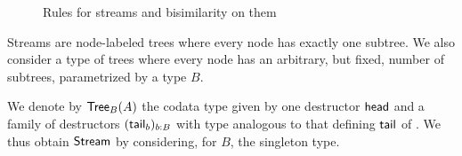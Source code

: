 \documentclass[a4paper,USenglish]{lipics}
\begin{document}
\begin{ex}
\begin{figure}
 \begin{mdframed}
  
 \end{mdframed}
 \caption{Rules for streams and bisimilarity on them} \label{stream_rules}
\end{figure}

% 

\begin{comment}
  \begin{figure}[bt]
  \centering

     \def\extraVskip{3pt}
     \def\proofSkipAmount{\vskip.8ex plus.8ex minus.4ex}
    \AxiomC{$t : \stream A$} %
     \UnaryInfC{$\shead_A~t : A$}
      \DisplayProof
                        \hspace{3ex}
                                       \AxiomC{$t : \stream A$}%
                                       \UnaryInfC{$\stail_A~t : \stream A$}
                                       \DisplayProof%
% 
% 
% 
\hspace{3ex}
 \centering
                                            \def\extraVskip{3pt}
     \def\proofSkipAmount{\vskip.8ex plus.8ex minus.4ex}
    \AxiomC{$t \sim t'$} %
     \UnaryInfC{$\shead~t = \shead~t'$}
      \DisplayProof
                        \hspace{3ex}
                                       \AxiomC{$t \sim t'$} %
                                       \UnaryInfC{$ \stail~t \sim \stail~t'$}
                                       \DisplayProof   
  \caption{Destructors and bisimilarity for the coinductive family $\stream$} \label{fig:stream_destructors}
\end{figure}
\end{comment}
   

\end{ex}


\begin{Long}

Streams are node-labeled trees where every node has exactly one subtree.
We also consider a type of trees where every node has an arbitrary, but fixed, number of subtrees, 
parametrized by a type $B$.



\begin{ex}\label{ex_trees}
 We denote by $\mathsf{Tree}_B(A)$ the codata type given by one destructor $\mathsf{head}$ and a family of 
 destructors $(\mathsf{tail}_b)_{b:B}$ with type analogous to that defining $\mathsf{tail}$ of .
 We thus obtain $\mathsf{Stream}$ by considering, for $B$, the singleton type.
\end{ex}

\end{Long}
\end{document}

